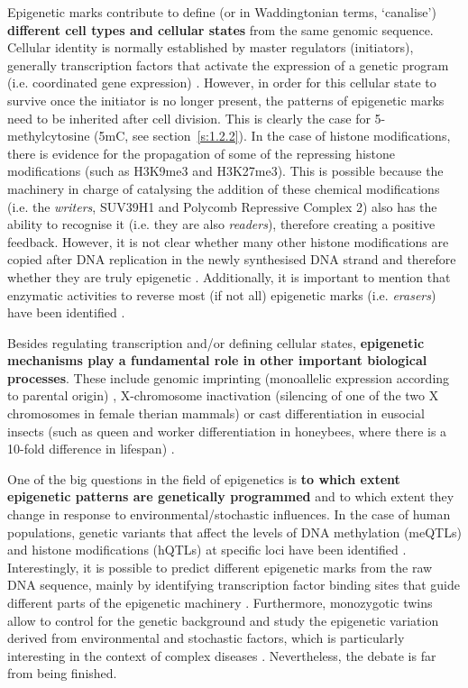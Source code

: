 Epigenetic marks contribute to define (or in Waddingtonian terms, `canalise') \textbf{different cell types and cellular states} from the same genomic sequence. Cellular identity is normally established by master regulators (initiators), generally transcription factors that activate the expression of a genetic program (i.e. coordinated gene expression) \citep{Reinberg2018}. However, in order for this cellular state to survive once the initiator is no longer present, the patterns of epigenetic marks need to be inherited after cell division. This is clearly the case for 5-methylcytosine (\acrshort{5mC}, see section~\ref{s:1.2.2}). In the case of histone modifications, there is evidence for the propagation of some of the repressing histone modifications (such as H3K9me3 and H3K27me3). This is possible because the machinery in charge of catalysing the addition of these chemical modifications (i.e. the \textit{writers}, SUV39H1 and Polycomb Repressive Complex 2) also has the ability to recognise it (i.e. they are also \textit{readers}), therefore creating a positive feedback. However, it is not clear whether many other histone modifications are copied after DNA replication in the newly synthesised DNA strand and therefore whether they are truly epigenetic \citep{Reinberg2018}. Additionally, it is important to mention that enzymatic activities to reverse most (if not all) epigenetic marks (i.e. \textit{erasers}) have been identified \citep{Allis2016}.

\bigskip

Besides regulating transcription and/or defining cellular states, \textbf{epigenetic mechanisms play a fundamental role in other important biological processes}. These include genomic imprinting (monoallelic expression according to parental origin) \citep{Peters2014}, X-chromosome inactivation (silencing of one of the two X chromosomes in female therian mammals) \citep{Wutz2011} or cast differentiation in eusocial insects (such as queen and worker differentiation in honeybees, where there is a 10-fold difference in lifespan) \citep{Patalano2012,Remolina2008}.

\bigskip

One of the big questions in the field of epigenetics is \textbf{to which extent epigenetic patterns are genetically programmed} and to which extent they change in response to environmental/stochastic influences. In the case of human populations, genetic variants that affect the levels of DNA methylation (\acrshort{meQTLs}) and histone modifications (\acrshort{hQTLs}) at specific loci have been identified \citep{Taudt2016}. Interestingly, it is possible to predict different epigenetic marks from the raw DNA sequence, mainly by identifying transcription factor binding sites that guide different parts of the epigenetic machinery \citep{Whitaker2014}. Furthermore, monozygotic twins allow to control for the genetic background and study the epigenetic variation derived from environmental and stochastic factors, which is particularly interesting in the context of complex diseases \citep{Castillo-Fernandez2014}. Nevertheless, the debate is far from being finished.

